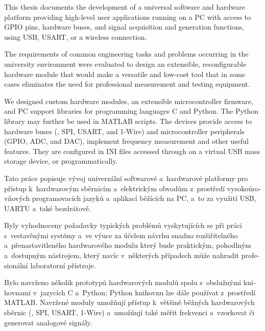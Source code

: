 
\begin{abstract-english}
This thesis documents the development of a universal software and hardware platform providing high-level user applications running on a PC with access to GPIO pins, hardware buses, and signal acquisition and generation functions, using USB, USART, or a wireless connection.

The requirements of common engineering tasks and problems occurring in the university environment were evaluated to design an extensible, reconfigurable hardware module that would make a versatile and low-cost tool that in some cases eliminates the need for professional measurement and testing equipment.

We designed custom hardware modules, an extensible microcontroller firmware, and PC support libraries for programming languages C and Python. The Python library may further  be used in MATLAB scripts. The devices provide access to hardware buses (\IIC, SPI, USART, and 1-Wire) and microcontroller peripherals (GPIO, ADC, and DAC), implement frequency measurement and other useful features. They are configured in INI files accessed through on a virtual USB mass storage device, or programmatically.
\end{abstract-english}

\begin{abstract-czech}
\begin{otherlanguage}{czech}
Tato práce popisuje vývoj univerzální softwarové a~hardwarové platformy pro přístup k~hardwarovým sběrnicím a~elektrickým obvodům z~prostředí vysokoúrovňových programovacích jazyků a~aplikací běžících na PC, a~to za využití USB, UARTU a~také bezdrátově.

Byly vyhodnoceny požadavky typických problémů vyskytujících se při práci s~vestavěnými systémy a~ve výuce za účelem návrhu snadno rozšiřitelného a~přenastavitleného hardwarového modulu který bude praktickým, pohodlným a~dostupným nástrojem, který navíc v~některých případech může nahradit profesionální laboratorní přístroje.

Bylo navrženo několik prototypů hardwarových modulů spolu s~obslužnými knihovnami v~jazycích C a~Python; Python knihovnu lze dále používat z~prostředí MATLAB. Navržené moduly umožňují přístup k~většině běžných hardwarových sběrnic (\IIC, SPI, USART, 1-Wire) a~umožňují také měřit frekvenci a~vzorkovat či generovat analogové signály.
\end{otherlanguage}
\end{abstract-czech}
